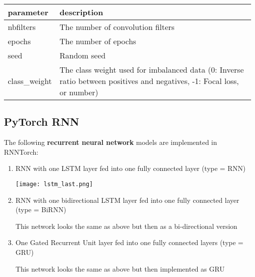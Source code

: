 \documentclass[]{article}
\begin{document}
\begin{longtable}[]{@{}ll@{}}
\toprule
\begin{minipage}[b]{0.14\columnwidth}\raggedright\strut
parameter\strut
\end{minipage} & \begin{minipage}[b]{0.35\columnwidth}\raggedright\strut
description\strut
\end{minipage}\tabularnewline
\midrule
\endhead
\begin{minipage}[t]{0.14\columnwidth}\raggedright\strut
nbfilters\strut
\end{minipage} & \begin{minipage}[t]{0.35\columnwidth}\raggedright\strut
The number of convolution filters\strut
\end{minipage}\tabularnewline
\begin{minipage}[t]{0.14\columnwidth}\raggedright\strut
epochs\strut
\end{minipage} & \begin{minipage}[t]{0.35\columnwidth}\raggedright\strut
The number of epochs\strut
\end{minipage}\tabularnewline
\begin{minipage}[t]{0.14\columnwidth}\raggedright\strut
seed\strut
\end{minipage} & \begin{minipage}[t]{0.35\columnwidth}\raggedright\strut
Random seed\strut
\end{minipage}\tabularnewline
\begin{minipage}[t]{0.14\columnwidth}\raggedright\strut
class\_weight\strut
\end{minipage} & \begin{minipage}[t]{0.35\columnwidth}\raggedright\strut
The class weight used for imbalanced data (0: Inverse ratio between
positives and negatives, -1: Focal loss, or number)\strut
\end{minipage}\tabularnewline
\bottomrule
\end{longtable}

\subsection{PyTorch RNN}\label{pytorch-rnn}

The following \textbf{recurrent neural network} models are implemented
in RNNTorch:

\begin{enumerate}
\def\labelenumi{\arabic{enumi})}
\item
  RNN with one LSTM layer fed into one fully connected layer (type =
  RNN)

  \texttt{[image: lstm\_last.png]}
\item
  RNN with one bidirectional LSTM layer fed into one fully connected
  layer (type = BiRNN)

  This network looks the same as above but then as a bi-directional
  version
\item
  One Gated Recurrent Unit layer fed into one fully connected layers
  (type = GRU)

  This network looks the same as above but then implemented as GRU
\end{enumerate}
\end{document}
